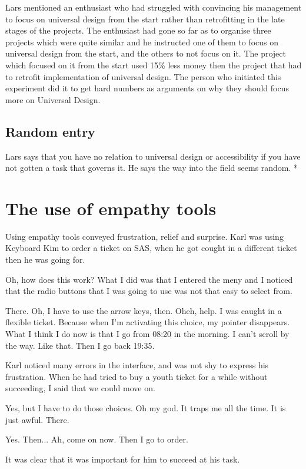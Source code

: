 Lars mentioned an enthusiast who had struggled with convincing his management to focus on universal design from the start rather than retrofitting in the late stages of the projects. The enthusiast had gone so far as to organise three projects which were quite similar and he instructed one of them to focus on universal design from the start, and the others to not focus on it. The project which focused on it from the start used 15\% less money then the project that had to retrofit implementation of universal design. The person who initiated this experiment did it to get hard numbers as arguments on why they should focus more on Universal Design.

\subsection{Random entry}
Lars says that you have no relation to universal design or accessibility if you have not gotten a task that governs it. He says the way into the field seems random. *


\section{The use of empathy tools}
Using empathy tools conveyed frustration, relief and surprise. Karl was using Keyboard Kim to order a ticket on SAS, when he got cought in a different ticket then he was going for.

\begin{displayquote}
    Oh, how does this work? What I did was that I entered the meny and I noticed that the radio buttons that I was going to use was not that easy to select from.
    
    There. Oh, I have to use the arrow keys, then. Oheh, help. I was caught in a flexible ticket. Because when I'm activating this choice, my pointer disappears. What I think I do now is that I go from 08:20 in the morning. I can't scroll by the way. Like that. Then I go back 19:35.
\end{displayquote}

Karl noticed many errors in the interface, and was not shy to express his frustration. When he had tried to buy a youth ticket for a while without succeeding, I said that we could move on.

\begin{displayquote}
    Yes, but I have to do those choices. Oh my god. It traps me all the time. It is just awful. There.
    
    Yes. Then... Ah, come on now. Then I go to order.
\end{displayquote}

It was clear that it was important for him to succeed at his task.

